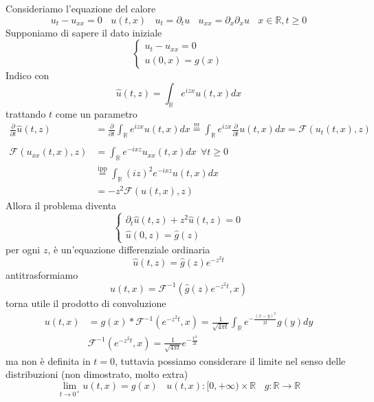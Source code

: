 Consideriamo l'equazione del calore
\begin{equation*}
u_{t} -u_{xx} =0\ \ \ \ u( t,x) \ \ \ \ u_{t} =\partial _{t} u\ \ \ \ u_{xx} =\partial _{x} \partial _{x} u\ \ \ \ x\in \mathbb{R} ,t\geqslant 0
\end{equation*}
Supponiamo di sapere il dato iniziale
\begin{equation*}
\begin{cases}
u_{t} -u_{xx} =0\\
u( 0,x) =g( x)
\end{cases}
\end{equation*}
Indico con
\begin{equation*}
\hat{u}( t,z) =\int _{\mathbb{R}} e^{izx} u( t,x) dx
\end{equation*}
trattando $t$ come un parametro
\begin{equation*}
\begin{aligned}
\frac{\partial }{\partial t}\hat{u}( t,z) & =\frac{\partial }{\partial t}\int _{\mathbb{R}} e^{izx} u( t,x) dx\overset{!!!}{=}\int _{\mathbb{R}} e^{izx}\frac{\partial }{\partial t} u( t,x) dx=\mathcal{F}( u_{t}( t,x) ,z)\\
 & \\
\mathcal{F}( u_{xx}( t,x) ,z) & =\int _{\mathbb{R}} e^{-ixz} u_{xx}( t,x) dx\ \ \forall t\geqslant 0\\
 & \overset{\text{ipp}}{=}\int _{\mathbb{R}}( iz)^{2} e^{-ixz} u( t,x) dx\\
 & =-z^{2}\mathcal{F}( u( t,x) ,z)
\end{aligned}
\end{equation*}
Allora il problema diventa
\begin{equation*}
\begin{cases}
\partial _{t}\hat{u}( t,z) +z^{2}\hat{u}( t,z) =0\\
\hat{u}( 0,z) =\hat{g}( z)
\end{cases}
\end{equation*}
per ogni $z$, è un'equazione differenziale ordinaria
\begin{equation*}
\hat{u}( t,z) =\hat{g}( z) e^{-z^{2} t}
\end{equation*}
antitrasformiamo
\begin{equation*}
u( t,x) =\mathcal{F}^{-1}\left(\hat{g}( z) e^{-z^{2} t} ,x\right)
\end{equation*}
torna utile il prodotto di convoluzione
\begin{equation*}
\begin{aligned}
u( t,x) & =g( x) *\mathcal{F}^{-1}\left( e^{-z^{2} t} ,x\right) =\frac{1}{\sqrt{4\pi t}}\int _{\mathbb{R}} e^{-\frac{( x-y)^{2}}{2t}} g( y) dy\\
 & \mathcal{F}^{-1}\left( e^{-z^{2} t} ,x\right) =\frac{1}{\sqrt{4\pi t}} e^{-\frac{x^{2}}{2t}}
\end{aligned}
\end{equation*}
ma non è definita in $t=0$, tuttavia possiamo considerare il limite nel senso delle distribuzioni (non dimostrato, molto extra)
\begin{equation*}
\lim _{t\rightarrow 0^{+}} u( t,x) =g( x) \ \ \ \ u( t,x) :[ 0,+\infty ) \times \mathbb{R} \ \ \ \ g:\mathbb{R}\rightarrow \mathbb{R}
\end{equation*}
